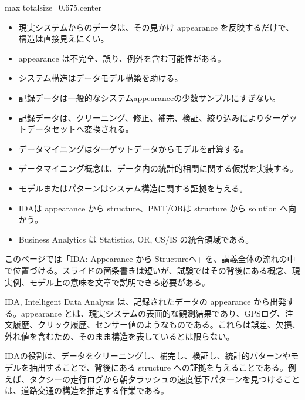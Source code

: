 \clearpage
{}
\begin{adjustbox}{max totalsize={\textwidth}{0.675\textheight},center}
\begin{minipage}{\textwidth}\scriptsize
\begin{minipage}[t]{0.485\textwidth}
\begin{itemize}
\item 現実システムからのデータは、その見かけ appearance を反映するだけで、構造は直接見えにくい。
\item appearance は不完全、誤り、例外を含む可能性がある。
\item システム構造はデータモデル構築を助ける。
\item 記録データは一般的なシステムappearanceの少数サンプルにすぎない。
\item 記録データは、クリーニング、修正、補完、検証、絞り込みによりターゲットデータセットへ変換される。
\item データマイニングはターゲットデータからモデルを計算する。
\item データマイニング概念は、データ内の統計的相関に関する仮説を実装する。
\item モデルまたはパターンはシステム構造に関する証拠を与える。
\end{itemize}
\begin{itemize}
\item IDAは appearance から structure、PMT/ORは structure から solution へ向かう。
\item Business Analytics は Statistics, OR, CS/IS の統合領域である。
\end{itemize}
\end{minipage}\hfill
\begin{minipage}[t]{0.485\textwidth}
このページでは「IDA: Appearance から Structureへ」を、講義全体の流れの中で位置づける。スライドの箇条書きは短いが、試験ではその背後にある概念、現実例、モデル上の意味を文章で説明できる必要がある。\par
IDA, Intelligent Data Analysis は、記録されたデータの appearance から出発する。appearance とは、現実システムの表面的な観測結果であり、GPSログ、注文履歴、クリック履歴、センサー値のようなものである。これらは誤差、欠損、外れ値を含むため、そのまま構造を表しているとは限らない。\par
IDAの役割は、データをクリーニングし、補完し、検証し、統計的パターンやモデルを抽出することで、背後にある structure への証拠を与えることである。例えば、タクシーの走行ログから朝夕ラッシュの速度低下パターンを見つけることは、道路交通の構造を推定する作業である。\par

\end{minipage}
\end{minipage}
\end{adjustbox}
